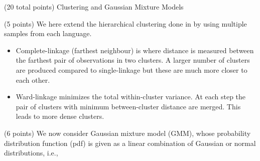 \documentclass[12pt]{article}
\begin{document}
\begin{question}{(20 total points) Clustering and Gaussian Mixture Models}
\begin{subquestion}{(5 points)
       We here extend the hierarchical clustering done in  by
       using multiple samples from each language.
     }
\begin{answerbox}{50em}
\begin{itemize}
             \item Complete-linkage (farthest neighbour) is where distance is measured between the farthest pair of observations in two clusters. A larger number of clusters are produced compared to single-linkage but these are much more closer to each other.
             \item Ward-linkage minimizes the total within-cluster variance. At each step the pair of clusters with minimum between-cluster distance are merged. This leads to more dense clusters. 
         \end{itemize}
      \end{answerbox}
  


   \end{subquestion}
   \begin{subquestion}{(6 points)
       We now consider Gaussian mixture model (GMM), whose
       probability distribution function (pdf) is given as
       a linear combination of Gaussian or normal distributions, i.e.,
     } \label{Q3.5}





\end{subquestion}
\end{question}
\end{document}
